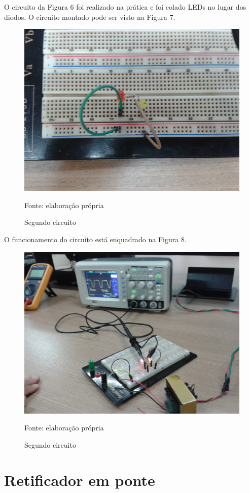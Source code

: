 \documentclass[
	12pt,				%
	openright,			%
	twoside,			%
	a4paper,			%
	article,	
	english,			%
	french,				%
	spanish,			%
	brazil				%
	]{abntex2}
\begin{document}
\par O circuito da Figura 6 foi realizado na prática e foi colado LEDs no lugar dos diodos. O circuito montado pode ser visto na Figura 7.

\begin{figure}[H]\centering
\caption{Segundo circuito}
\includegraphics[scale=0.3]{circ2.jpeg}

Fonte: elaboração própria
\end{figure}

O funcionamento do circuito está enquadrado na Figura 8.

\begin{figure}[H]\centering
\caption{Segundo circuito}
\includegraphics[scale=0.3]{adasd.jpeg}

Fonte: elaboração própria
\end{figure}

\section{Retificador em ponte}
\end{document}
